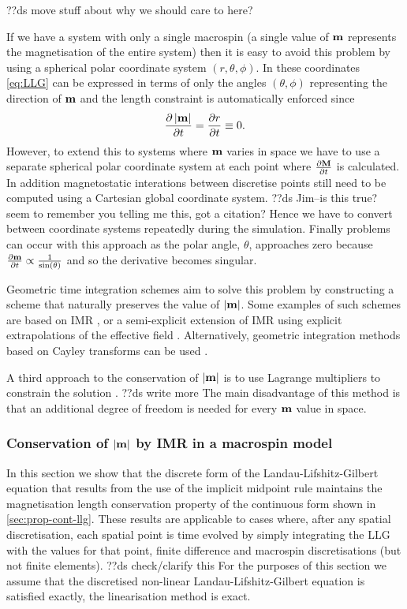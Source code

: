 ??ds move stuff about why we should care to here?

If we have a system with only a single macrospin (\ie a single value of $\mathbf{m}$ represents the magnetisation of the entire system) then it is easy to avoid this problem by using a spherical polar coordinate system $(r,\theta,\phi)$.
In these coordinates \cref{eq:LLG} can be expressed in terms of only the angles $(\theta,\phi)$ representing the direction of $\mathbf{m}$ and the length constraint is automatically enforced since
\begin{equation}
  \label{eq:40}
  \frac{\partial \left|{\mathbf{m}} \right|}{\partial t} = \frac{\partial r}{\partial t} \equiv 0.
\end{equation}
However, to extend this to systems where $\mathbf{m}$ varies in space we have to use a separate spherical polar coordinate system at each point where $\frac{\partial \mathbf{M}}{\partial t}$ is calculated.
In addition magnetostatic interations between discretise points still need to be computed using a Cartesian global coordinate system.
??ds Jim--is this true? seem to remember you telling me this, got a citation?
Hence we have to convert between coordinate systems repeatedly during the simulation.
Finally problems can occur with this approach as the polar angle, $\theta$, approaches zero because $\frac{\partial \mathbf{m}}{\partial t} \propto \frac{1}{\sin(\theta)}$ \cite{Fukushima2005} and so the derivative becomes singular.

Geometric time integration schemes aim to solve this problem by constructing a scheme that naturally preserves the value of $\left|{\mathbf{m}} \right|$.
Some examples of such schemes are based on IMR \cite{DAquino2005}, or a semi-explicit extension of IMR using explicit extrapolations of the effective field \cite{Spargo2003} \cite{Serpico2001}.
Alternatively, geometric integration methods based on Cayley transforms can be used \cite{Lewis2003} \cite{Bottauscio2011}.

A third approach to the conservation of $\left|{\mathbf{m}} \right|$ is to use Lagrange multipliers to constrain the solution \cite{Szambolics2008a}.
??ds write more
The main disadvantage of this method is that an additional degree of freedom is needed for every $\mathbf{m}$ value in space. 


\subsubsection{Conservation of $\left|{\mathbf{m}} \right|$ by IMR in a macrospin model}
\label{sec:proof-magn-length-ode-imr-llg}

In this section we show that the discrete form of the Landau-Lifshitz-Gilbert equation that results from the use of the implicit midpoint rule maintains the magnetisation length conservation property of the continuous form shown in \cref{sec:prop-cont-llg}.
These results are applicable to cases where, after any spatial discretisation, each spatial point is time evolved by simply integrating the LLG with the values for that point, \ie finite difference and macrospin discretisations (but not finite elements).
??ds check/clarify this
For the purposes of this section we assume that the discretised non-linear Landau-Lifshitz-Gilbert equation is satisfied exactly, \ie the linearisation method is exact.

